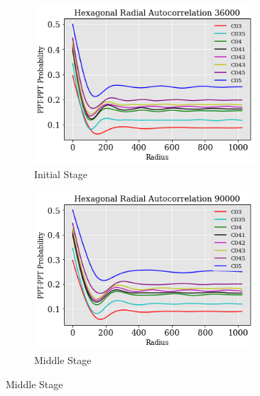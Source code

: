 \documentclass[12pt, a4paper]{report}
\begin{document}
\begin{figure}[H]
\centering
\begin{subfigure}{.45\textwidth}
  \centering
  \includegraphics[width=0.9\textwidth]{Pictures/Comparison/Radial Auto comparison/hex_36k_C3453545.png}
  \caption{Initial Stage}
  \label{img:microstrImg}
\end{subfigure}
\begin{subfigure}{.45\textwidth}
  \centering
  \includegraphics[width=0.9\textwidth]{Pictures/Comparison/Radial Auto comparison/hex_90k_C3453545.png}
  \caption{Middle Stage}
  \label{img:microstrImg}
\end{subfigure}


\end{figure}
\end{document}
